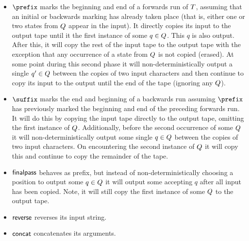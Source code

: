 {\begin{itemize}
\item
    $\prefix$ marks the beginning and end of a forwards run of $T$,
    assuming that an initial or backwards marking has already taken place (that
    is, either one or two states from $Q$ appear in the input).
    It directly copies its input to the output tape until it the first instance
    of some
    $q \in Q$.
    This $q$ is also output.
    After this, it will copy the rest of the input tape to the output tape with
    the exception that any occurrence of a state from $Q$ is not copied
    (erased).
    At some point during this second phase it will non-deterministically output
    a single
    $q' \in Q$
    between the copies of two input characters and then continue to copy its
    input to the output until the end of the tape (ignoring any $Q$).

\item
    $\suffix$ marks the end and beginning of a backwards run assuming $\prefix$
    has previously marked the beginning and end of the preceding forwards run.
    It will do this by copying the input tape directly to the output tape,
    omitting the first instance of $Q$.
    Additionally, before the second occurrence of some $Q$ it will
    non-deterministically output some single $q \in Q$ between the
    copies of two input characters.
    On encountering the second instance of $Q$ it will copy this and
    continue to copy the remainder of the tape.

\item
    $\mathsf{finalpass}$ behaves as prefix, but instead of non-deterministically
    choosing a position to output some
    $q \in Q$
    it will output some accepting $q$ after all input has been copied.
    Note, it will still copy the first instance of some $Q$ to the
    output tape.

\item
    $\mathsf{reverse}$ reverses its input string.

\item
    $\mathsf{concat}$ concatenates its arguments.
\end{itemize}

}
